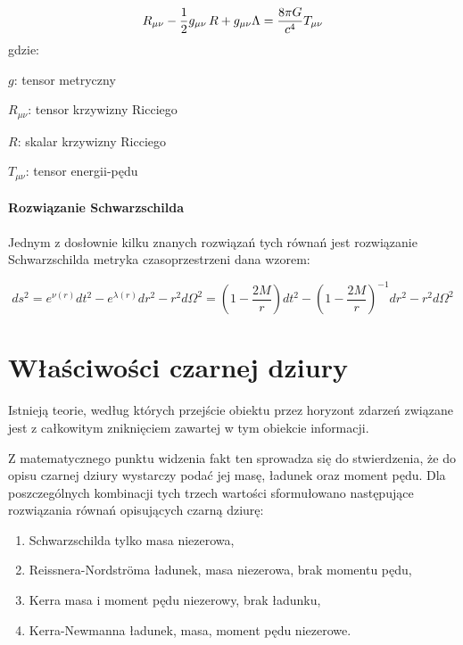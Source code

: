 \documentclass[12pt]{article}
\begin{document}
\begin{equation*}
R_{\mu \nu} - {1 \over 2}g_{\mu \nu}\,R + g_{\mu \nu} \Lambda = 
 {8 \pi G \over c^4} T_{\mu \nu}
\end{equation*}
gdzie:
\begin{description}
    \item $g$: tensor metryczny
    \item $R_{\mu \nu}$: tensor krzywizny Ricciego
    \item $R$: skalar krzywizny Ricciego
    \item $T_{\mu \nu}$: tensor energii-p\k{e}du
\end{description}


\paragraph{Rozwi\k{a}zanie Schwarzschilda}
Jednym z dos\l{}ownie kilku znanych rozwi\k{a}za\'{n} tych r\'{o}wna\'{n} jest rozwi\k{a}zanie Schwarzschilda \textendash{} metryka czasoprzestrzeni dana wzorem:

\begin{equation*}
ds^2 = e^{\nu(r)} dt^2 - e^{\lambda(r)} dr^2 - r^2 d\Omega^2 = \left(1 - \frac{2M}{r}\right) dt^2 - \left(1 - \frac{2M}{r}\right)^{-1}dr^2 - r^2 d\Omega^2
\end{equation*}
\newpage

\section{W\l{}a\'{s}ciwo\'{s}ci czarnej dziury}
Istniej\k{a} teorie, wed\l{}ug kt\'{o}rych przej\'{s}cie obiektu przez horyzont zdarze\'{n} zwi\k{a}zane jest z ca\l{}kowitym znikni\k{e}ciem zawartej w tym obiekcie informacji.

Z matematycznego punktu widzenia fakt ten sprowadza si\k{e} do stwierdzenia, \.{z}e do opisu czarnej dziury wystarczy poda\'{c} jej mas\k{e}, \l{}adunek oraz moment p\k{e}du. Dla poszczeg\'{o}lnych kombinacji tych trzech warto\'{s}ci sformu\l{}owano nast\k{e}puj\k{a}ce rozwi\k{a}zania r\'{o}wna\'{n} opisuj\k{a}cych czarn\k{a} dziur\k{e}:
 
\begin{enumerate}
\item Schwarzschilda \textendash{} tylko masa niezerowa,
\item Reissnera-Nordstr\"{o}ma \textendash{} \l{}adunek, masa niezerowa, brak momentu p\k{e}du,
\item Kerra \textendash{} masa i moment p\k{e}du niezerowy, brak \l{}adunku,
\item Kerra-Newmanna \textendash{} \l{}adunek, masa, moment p\k{e}du niezerowe.
\end{enumerate}
\end{document}
